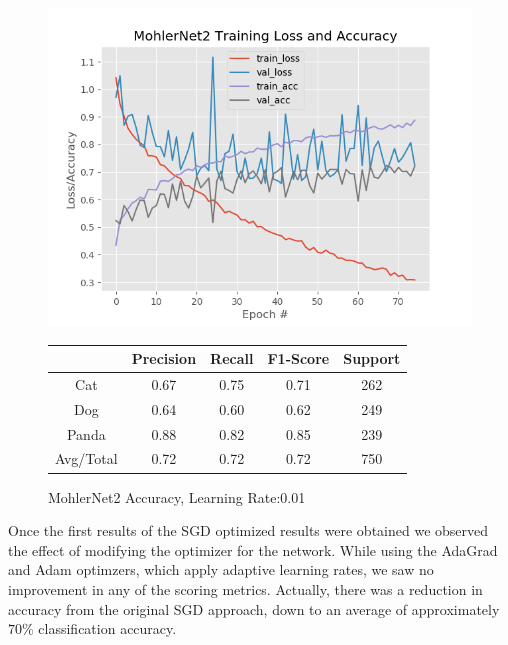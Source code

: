 \documentclass[12pt]{article}
\begin{document}
\begin{figure}[h]
	\centering %
	\captionsetup{justification=centering}
	\begin{minipage}{0.5\textwidth}
		\centering %
		\includegraphics[width=1\textwidth]{MohlerNet2_opt-SGD_KEEP.png}
		\caption{MohlerNet2 Accuracy, Learning Rate:0.01} \label{MN2}
	\end{minipage}\hfill
	\begin{minipage}{0.5\textwidth}
		\begin{center}
			\begin{tabular}[5pt]{| c| c| c| c|c|}
				\hline
					& Precision & Recall & F1-Score & Support \\[0.5ex] 
				\hline 	
				 Cat   &    0.67  &    0.75   &   0.71   &    262\\ \hline 
				 Dog    &   0.64    &  0.60   &   0.62   &    249\\ \hline 
				 Panda   &    0.88   &  0.82 &     0.85  &     239\\ \hline 
				 Avg/Total  &     0.72    &  0.72 &     0.72    &   750\\ \hline 

			\end{tabular}
			\label{MNR}
		\end{center}	
	\end{minipage}
\end{figure}

Once the first results of the SGD optimized results were obtained we observed the effect of modifying the optimizer for the network. While using the AdaGrad and Adam optimzers, which apply adaptive learning rates, we saw no improvement in any of the scoring metrics. Actually, there was a reduction in accuracy from the original SGD approach, down to an average of approximately $70\%$ classification accuracy.   
\end{document}
